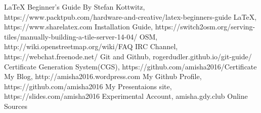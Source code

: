 
\begin{thebibliography}{9}
\bibitem{} \LaTeX{} Beginner's Guide By Stefan Kottwitz, https://www.packtpub.com/hardware-and-creative/latex-beginners-guide 
\bibitem{} \LaTeX{}, https://www.sharelatex.com
\bibitem{} Installation Guide, https://switch2osm.org/serving-tiles/manually-building-a-tile-server-14-04/
\bibitem{} OSM, http://wiki.openstreetmap.org/wiki/FAQ
\bibitem{} IRC Channel, https://webchat.freenode.net/
\bibitem{} Git and Github, rogerdudler.github.io/git-guide/
\bibitem{} Certificate Generation System(CGS), https://github.com/amisha2016/Certificate
\bibitem{} My Blog, http://amisha2016.wordpress.com
\bibitem{} My Github Profile, https://github.com/amisha2016
\bibitem{} My Presentaions site, https://slides.com/amisha2016
\bibitem{} Experimental Account, amisha.gdy.club
\bibitem{} Online Sources
\end{thebibliography}



